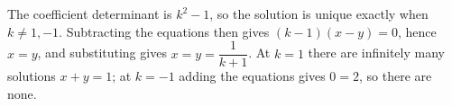 The coefficient determinant is $k^2-1$, so the solution is unique exactly when $k\ne1,-1$. Subtracting the equations then gives $(k-1)(x-y)=0$, hence $x=y$, and substituting gives $\boxed{x=y=\dfrac{1}{k+1}}$. At $k=1$ there are infinitely many solutions $x+y=1$; at $k=-1$ adding the equations gives $0=2$, so there are none.
